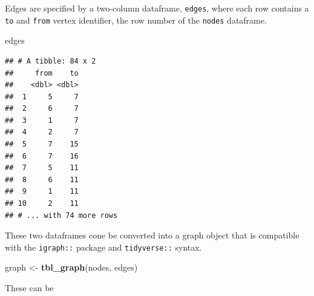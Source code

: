 \documentclass[
]{article}
\newenvironment{Shaded}{\begin{snugshade}}{\end{snugshade}}
\newcommand{\KeywordTok}[1]{\textcolor[rgb]{0.13,0.29,0.53}{\textbf{#1}}}
\newcommand{\NormalTok}[1]{#1}
\newcommand{\StringTok}[1]{\textcolor[rgb]{0.31,0.60,0.02}{#1}}
\begin{document}
Edges are specified by a two-column dataframe, \texttt{edges}, where
each row contains a \texttt{to} and \texttt{from} vertex identifier, the
row number of the \texttt{nodes} dataframe.

\begin{Shaded}
\begin{Highlighting}[]
\NormalTok{edges}
\end{Highlighting}
\end{Shaded}

\begin{verbatim}
## # A tibble: 84 x 2
##     from    to
##    <dbl> <dbl>
##  1     5     7
##  2     6     7
##  3     1     7
##  4     2     7
##  5     7    15
##  6     7    16
##  7     5    11
##  8     6    11
##  9     1    11
## 10     2    11
## # ... with 74 more rows
\end{verbatim}

These two dataframes cone be converted into a graph object that is
compatible with the \texttt{igraph::} package and \texttt{tidyverse::}
syntax.

\begin{Shaded}
\begin{Highlighting}[]
\NormalTok{graph <{-}}\StringTok{ }\KeywordTok{tbl\_graph}\NormalTok{(nodes, edges)}
\end{Highlighting}
\end{Shaded}

These can be
\end{document}
